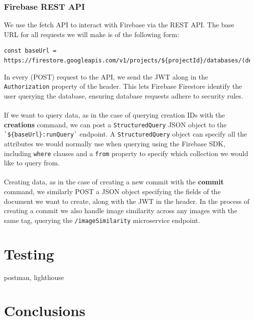 \documentclass[12pt,a4paper]{article}
\begin{document}
\subsubsection{Firebase REST API}
We use the fetch API to interact with Firebase via the REST API. The base URL for all requests we will make is of the following form:
\begin{lstlisting}
const baseUrl = https://firestore.googleapis.com/v1/projects/${projectId}/databases/(default)/documents
\end{lstlisting}
In every (POST) request to the API, we send the JWT along in the \verb|Authorization| property of the header. This lets Firebase Firestore identify the user querying the database, ensuring database requests adhere to security rules.
\\\\
If we want to query data, as in the case of querying creation IDs with the \textbf{creations} command, we can post a \verb|StructuredQuery| JSON object to the \verb|`${baseUrl}:runQuery`| endpoint. A \verb|StructuredQuery| object can specify all the attributes we would normally use when querying using the Firebase SDK, including \verb|where| clauses and a \verb|from| property to specify which collection we would like to query from. 
\\\\
Creating data, as in the case of creating a new commit with the \textbf{commit} command, we similarly POST a JSON object specifying the fields of the document we want to create, along with the JWT in the header. In the process of creating a commit we also handle image similarity across any images with the same tag, querying the \verb|/imageSimilarity| microservice endpoint.
\section{Testing}
postman, lighthouse
\section{Conclusions}
\end{document}
